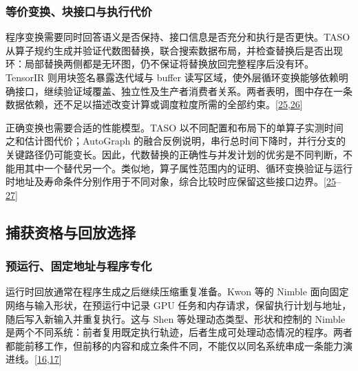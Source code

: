 \documentclass[
  UTF8,
  zihao=5]{ctexart}
\begin{document}
\hypertarget{ux7b49ux4ef7ux53d8ux6362ux5757ux63a5ux53e3ux4e0eux6267ux884cux4ee3ux4ef7}{%
\subsubsection{等价变换、块接口与执行代价}\label{ux7b49ux4ef7ux53d8ux6362ux5757ux63a5ux53e3ux4e0eux6267ux884cux4ee3ux4ef7}}

程序变换需要同时回答语义是否保持、接口信息是否充分和执行是否更快。TASO
从算子规约生成并验证代数图替换，联合搜索数据布局，并检查替换后是否出现环：局部替换两侧都是无环图，仍不保证将替换放回完整程序后没有环。TensorIR
则用块签名暴露迭代域与 buffer
读写区域，使外层循环变换能够依赖明确接口，继续验证域覆盖、独立性及生产者消费者关系。两者表明，图中存在一条数据依赖，还不足以描述改变计算或调度粒度所需的全部约束。{[}\protect\hyperlink{ref-jia2019taso}{25},\protect\hyperlink{ref-feng2023tensorir}{26}{]}

正确变换也需要合适的性能模型。TASO
以不同配置和布局下的单算子实测时间之和估计图代价；AutoGraph
的融合反例说明，串行总时间下降时，并行分支的关键路径仍可能变长。因此，代数替换的正确性与并发计划的优劣是不同判断，不能用其中一个替代另一个。类似地，算子属性范围内的证明、循环变换验证与运行时地址及寿命条件分别作用于不同对象，综合比较时应保留这些接口边界。{[}\protect\hyperlink{ref-jia2019taso}{25}--\protect\hyperlink{ref-zhao2023autograph}{27}{]}

\hypertarget{ux6355ux83b7ux8d44ux683cux4e0eux56deux653eux9009ux62e9}{%
\subsection{捕获资格与回放选择}\label{ux6355ux83b7ux8d44ux683cux4e0eux56deux653eux9009ux62e9}}

\hypertarget{ux9884ux8fd0ux884cux56faux5b9aux5730ux5740ux4e0eux7a0bux5e8fux4e13ux5316}{%
\subsubsection{预运行、固定地址与程序专化}\label{ux9884ux8fd0ux884cux56faux5b9aux5730ux5740ux4e0eux7a0bux5e8fux4e13ux5316}}

运行时回放通常在程序生成之后继续压缩重复准备。Kwon 等的 Nimble
面向固定网络与输入形状，在预运行中记录 GPU
任务和内存请求，保留执行计划与地址，随后写入新输入并重复执行。这与 Shen
等处理动态类型、形状和控制的 Nimble
是两个不同系统：前者复用既定执行轨迹，后者生成可处理动态情况的程序。两者都能前移工作，但前移的内容和成立条件不同，不能仅以同名系统串成一条能力演进线。{[}\protect\hyperlink{ref-kwon2020nimble}{16},\protect\hyperlink{ref-shen2021nimble}{17}{]}
\end{document}
